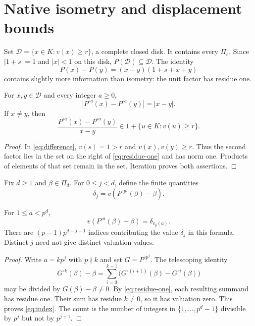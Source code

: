 \section{Native isometry and displacement bounds}
\label{sec:displacements}

Set $\mathcal D=\{x\in K:v(x)\ge r\}$, a complete closed disk.
It contains every $\Pi_e$. Since $|1+s|=1$ and $|x|<1$ on this
disk, $P(\mathcal D)\subseteq\mathcal D$. The identity
\begin{equation}\label{eq:difference}
 P(x)-P(y)=(x-y)(1+s+x+y)
\end{equation}
contains slightly more information than isometry: the unit factor
has residue one.

\begin{lemma}\label{lem:isometry}
For $x,y\in\mathcal D$ and every integer $a\ge0$,
\[
 |P^{\circ a}(x)-P^{\circ a}(y)|=|x-y|.
\]
If $x\ne y$, then
\begin{equation}\label{eq:residue-one}
 \frac{P^{\circ a}(x)-P^{\circ a}(y)}{x-y}
 \in 1+\{u\in K:v(u)\ge r\}.
\end{equation}
\end{lemma}
\begin{proof}
In \eqref{eq:difference}, $v(s)=1>r$ and $v(x),v(y)\ge r$.
Thus the second factor lies in the set on the right of
\eqref{eq:residue-one} and has norm one. Products of elements of
that set remain in the set. Iteration proves both assertions.
\end{proof}

Fix $d\ge1$ and $\beta\in\Pi_d$. For $0\le j<d$, define the
finite quantities
\begin{equation}\label{eq:deltas}
 \delta_j= v(P^{\circ p^j}(\beta)-\beta).
\end{equation}

\begin{lemma}\label{lem:index}
For $1\le a<p^d$,
\begin{equation}\label{eq:index}
 v(P^{\circ a}(\beta)-\beta)=\delta_{v_p(a)}.
\end{equation}
There are $(p-1)p^{d-j-1}$ indices contributing the value
$\delta_j$ in this formula. Distinct $j$ need not give distinct
valuation values.
\end{lemma}
\begin{proof}
Write $a=kp^j$ with $p\nmid k$ and set $G=P^{\circ p^j}$.
The telescoping identity
\[
 G^{\circ k}(\beta)-\beta
 =\sum_{i=0}^{k-1}
   \bigl(G^{\circ(i+1)}(\beta)-G^{\circ i}(\beta)\bigr)
\]
may be divided by $G(\beta)-\beta\ne0$. By
\eqref{eq:residue-one}, each resulting summand has residue one.
Their sum has residue $k\ne0$, so it has valuation zero. This
proves \eqref{eq:index}. The count is the number of integers in
$\{1,\ldots,p^d-1\}$ divisible by $p^j$ but not by $p^{j+1}$.
\end{proof}

